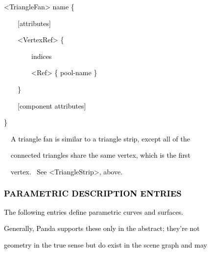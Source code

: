 \documentclass[a4paper]{article}
\newcommand\textstyleOOoComputerKeyWord[1]{\textrm{\textcolor[rgb]{0.0,0.0,0.5019608}{#1}}}
\begin{document}
\bigskip

{\color{black}
\textstyleOOoComputerKeyWord{\textcolor{black}{{\textless}TriangleFan{\textgreater} name \{ }}}

{\color{black}
\textstyleOOoComputerKeyWord{\textcolor{black}{\ \ \ \ [attributes] }}}

{\color{black}
\textstyleOOoComputerKeyWord{\textcolor{black}{\ \ \ \ {\textless}VertexRef{\textgreater} \{ }}}

{\color{black}
\textstyleOOoComputerKeyWord{\textcolor{black}{\ \ \ \ \ \ \ \ indices }}}

{\color{black}
\textstyleOOoComputerKeyWord{\textcolor{black}{\ \ \ \ \ \ \ \ {\textless}Ref{\textgreater} \{ pool-name \} }}}

{\color{black}
\textstyleOOoComputerKeyWord{\textcolor{black}{\ \ \ \ \}}}}

{\color{black}
\textstyleOOoComputerKeyWord{\textcolor{black}{\ \ \ \ [component attributes]}}}

{\color{black}
\textstyleOOoComputerKeyWord{\textcolor{black}{\}}}}


\bigskip

{\color{black}
\textstyleOOoComputerKeyWord{\textcolor{black}{\ \ A triangle fan is similar to a triangle strip, except all of the}}}

{\color{black}
\textstyleOOoComputerKeyWord{\textcolor{black}{\ \ connected triangles share the same vertex, which is the first}}}

{\color{black}
\textstyleOOoComputerKeyWord{\textcolor{black}{\ \ vertex. \ See {\textless}TriangleStrip{\textgreater}, above.}}}


\bigskip


\bigskip


\bigskip

\clearpage\subsubsection[PARAMETRIC DESCRIPTION ENTRIES]{\textstyleOOoComputerKeyWord{\textcolor{black}{PARAMETRIC
DESCRIPTION ENTRIES}}}
\hypertarget{RefHeading7680869075401}{}
\bigskip

{\color{black}
\textstyleOOoComputerKeyWord{\textcolor{black}{The following entries define parametric curves and surfaces.}}}

{\color{black}
\textstyleOOoComputerKeyWord{\textcolor{black}{Generally, Panda supports these only in the abstract; they're not}}}

{\color{black}
\textstyleOOoComputerKeyWord{\textcolor{black}{geometry in the true sense but do exist in the scene graph and may}}}
\end{document}
